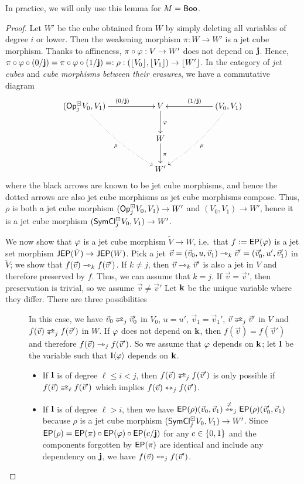 \documentclass[a4paper]{article}
\begin{document}
In practice, we will only use this lemma for $M = \mathsf{Boo}$.
\begin{proof}
	Let $W'$ be the cube obtained from $W$ by simply deleting all variables of degree $i$ or lower.
	Then the weakening morphism $\pi : W \to W'$ is a jet cube morphism.
	Thanks to affineness, $\pi \circ \varphi : V \to W'$ does not depend on $\mathbf{j}$.
	Hence, $\pi \circ \varphi \circ (0/\mathbf{j}) = \pi \circ \varphi \circ (1/\mathbf{j}) =: \rho : (\mathopen{}\left\lfloor V_0 \right\rfloor\mathclose{}, \mathopen{}\left\lfloor V_1 \right\rfloor\mathclose{}) \to \mathopen{}\left\lfloor W' \right\rfloor\mathclose{}$.
	In the category of \emph{jet cubes} and \emph{cube morphisms between their erasures}, we have a commutative diagram
	\[
		\xymatrix{
			(\Opcube_j V_0, V_1)
				\ar@{.>}@/_/[rrdd]_{\rho}
				\ar[rr]^{(0/\dm j)}
			&&
			V
				\ar[d]^\vfi
			&&
			(V_0, V_1)
				\ar@{.>}@/^/[lldd]^{\rho}
				\ar[ll]_{(1/\dm j)}
			\\
			&& W
				\ar[d]^\pi
			\\
			&& W'
		}
	\]
	where the black arrows are known to be jet cube morphisms, and hence the dotted arrows are also jet cube morphisms as jet cube morphisms compose.
	Thus, $\rho$ is both a jet cube morphism $({\mathsf{Op}}^\boxdot_j V_0, V_1) \to W'$ and $(V_0, V_1) \to W'$, hence it is a jet cube morphism $(\mathsf{SymCl}^\boxdot_j V_0, V_1) \to W'$.
	
	We now show that $\varphi$ is a jet cube morphism $\tilde V \to W$, i.e.\ that $f := \mathsf{EP}(\varphi)$ is a jet set morphism $\mathsf{JEP}(\tilde V) \to \mathsf{JEP}(W)$.
	Pick a jet $\vec v = (\vec v_0, u, \vec v_1) \rightarrowtriangle_k \vec v' = (\vec v_0', u', \vec v_1')$ in $\tilde V$; we show that $f(\vec v) \rightarrowtriangle_k f(\vec v')$.
	If $k \neq j$, then $\vec v \rightarrowtriangle_k \vec v'$ is also a jet in $V$ and therefore preserved by $f$.
	Thus, we can assume that $k = j$.
	If $\vec v = \vec v'$, then preservation is trivial, so we assume $\vec v \neq \vec v'$
	Let $\mathbf{k}$ be the unique variable where they differ.
	There are three possibilities
	\begin{description}
		\item[]
		In this case, we have $\vec v_0 \infrajet_j \vec v_0'$ in $V_0$, $u = u'$, $\vec v_1 = \vec v_1'$, $\vec v \infrajet_j \vec v'$ in $V$ and $f(\vec v) \infrajet_j f(\vec v')$ in $W$.
		If $\varphi$ does not depend on $\mathbf{k}$, then $f(\vec v) = f(\vec v')$ and therefore $f(\vec v) \rightarrowtriangle_j f(\vec v')$.
		So we assume that $\varphi$ depends on $\mathbf{k}$; let $\mathbf{l}$ be the variable such that $\mathbf{l} \langle \varphi \rangle$ depends on $\mathbf{k}$.
		\begin{itemize}
			\item If $\mathbf{l}$ is of degree $\ell \leq i < j$, then $f(\vec v) \infrajet_j f(\vec v')$ is only possible if $f(\vec v) \infrajet_\ell f(\vec v')$ which implies $f(\vec v) \leftrightarrowtriangle_j f(\vec v')$.
			\item If $\mathbf{l}$ is of degree $\ell > i$, then we have $\mathsf{EP}(\rho)(\vec v_0, \vec v_1) \overset{\neq}{\leftrightarrowtriangle}_j \mathsf{EP}(\rho)(\vec v_0', \vec v_1)$ because $\rho$ is a jet cube morphism $(\mathsf{SymCl}^\boxdot_j V_0, V_1) \to W'$.
			Since $\mathsf{EP}(\rho) = \mathsf{EP}(\pi) \circ \mathsf{EP}(\varphi) \circ \mathsf{EP}(c/\mathbf{j})$ for any $c \in \mathopen{}\left\{ 0, 1 \right\}\mathclose{}$ and the components forgotten by $\mathsf{EP}(\pi)$ are identical and include any dependency on $\mathbf{j}$, we have $f(\vec v) \leftrightarrowtriangle_j f(\vec v')$.
		\end{itemize}
		

\end{description}
\end{proof}
\end{document}
